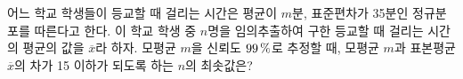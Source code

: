 어느 학교 학생들이 등교할 때 걸리는 시간은 평균이 $m$분, 표준편차가 35분인 정규분포를 따른다고 한다. 이 학교 학생 중 $n$명을 임의추출하여 구한 등교할 때 걸리는 시간의 평균의 값을 $\overline{x}$라 하자. 모평균 $m$을 신뢰도 $99\mkern3mu \%$로 추정할 때, 모평균 $m$과 표본평균 $\overline{x}$의 차가 15 이하가 되도록 하는 $n$의 최솟값은? 
